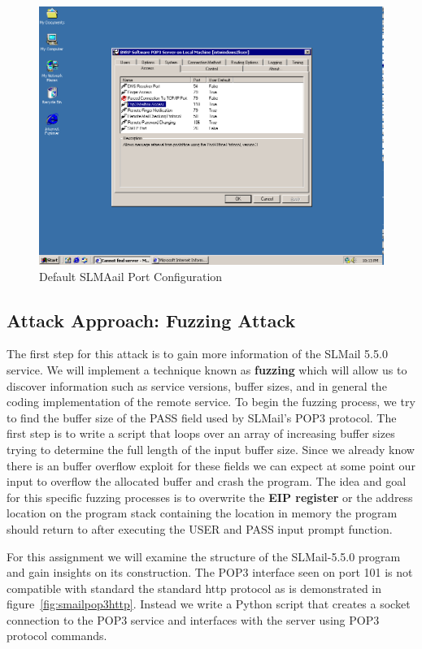 \documentclass[12pt]{article}
\begin{document}
\begin{figure}[ht]
    \centering
    \includegraphics[width=5.5in]{images/20160407_slmail_config.png}
    \caption{Default SLMAail Port Configuration}
    \label{fig:deafconfigslmail}
\end{figure}

\subsection{Attack Approach: Fuzzing Attack}
\label{sec:approachpassbuff}

The first step for this attack is to gain more information of the
SLMail 5.5.0 service. We will implement a technique known as \textbf{fuzzing}
which will allow us to discover information such as service versions, 
buffer sizes, and in general the coding implementation of the remote
service. To begin the fuzzing process, we try to find the buffer size of the 
PASS field used by SLMail's POP3 protocol. The first step is to write a 
script that loops over an array of increasing buffer sizes trying to 
determine the full length of the input buffer size. Since we already know 
there is an buffer overflow exploit for these fields we can expect at some 
point our input to overflow the allocated buffer and crash the program. 
The idea and goal for this specific fuzzing processes is to overwrite the 
\textbf{EIP register} or the address location on the program stack 
containing the location in memory the program should return to after 
executing the USER and PASS input prompt function.

For this assignment we will examine the structure of the SLMail-5.5.0 
program and gain insights on its construction. The POP3 interface seen on 
port 101 is not compatible with standard the standard http protocol as is 
demonstrated in figure~\ref{fig:smailpop3http}. Instead we write a Python
script that creates a socket connection to the POP3 service and interfaces
with the server using POP3 protocol commands. 
\end{document}
